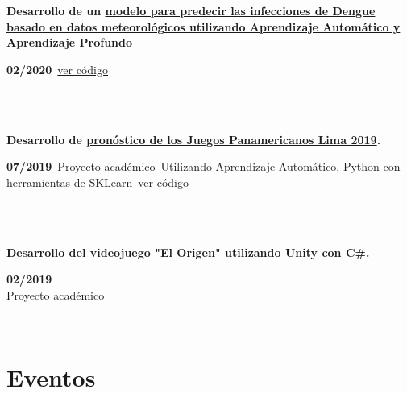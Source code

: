 \documentclass{article}
\begin{document}
    \begin{minipage}{0.8\textwidth}
    \parbox{0.8\linewidth}{\textbf{Desarrollo de un \hyperref[sec:dengue]{modelo para predecir las infecciones de Dengue basado en datos meteorológicos utilizando Aprendizaje Automático y Aprendizaje Profundo}}} \hfill \textbf{02/2020}\
    \href{https://github.com/JavierOramas/DengAI}{ver código}\
    \end{minipage} \hfill {}\\\\
    \begin{minipage}{0.8\textwidth}
    \parbox{0.8\linewidth}{\textbf{Desarrollo de \hyperref[sec:panamerican]{pronóstico de los Juegos Panamericanos Lima 2019}.}} \hfill \textbf{07/2019}\
    Proyecto académico\
    Utilizando Aprendizaje Automático, Python con herramientas de SKLearn\
    \href{https://github.com/JavierOramas/PanamericanPredictor}{ver código}\
\end{minipage} \hfill {}\\\\
\begin{minipage}{0.8\textwidth}
\parbox{0.8\linewidth}{\textbf{Desarrollo del videojuego "El Origen" utilizando Unity con C\#.}} \hfill \textbf{02/2019}\\
Proyecto académico\\
\end{minipage} \\
\section*{Eventos}
\end{document}
